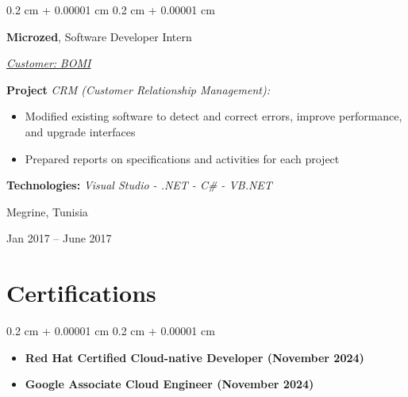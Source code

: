 \documentclass[10pt, a4paper]{article}
\newenvironment{highlights}{
    \begin{itemize}[
        topsep=0.10 cm,
        parsep=0.10 cm,
        partopsep=0pt,
        itemsep=0pt,
        leftmargin=0.4 cm + 10pt
    ]
}{
    \end{itemize}
} %
\newenvironment{highlightsforbulletentries}{
    \begin{itemize}[
        topsep=0.10 cm,
        parsep=0.10 cm,
        partopsep=0pt,
        itemsep=0pt,
        leftmargin=10pt
    ]
}{
    \end{itemize}
} %
\newenvironment{onecolentry}{
    \begin{adjustwidth}{
        0.2 cm + 0.00001 cm
    }{
        0.2 cm + 0.00001 cm
    }
}{
    \end{adjustwidth}
} %
\newenvironment{twocolentry}[2][]{
    \onecolentry
    \def\secondColumn{#2}
    \setcolumnwidth{\fill, 4.5 cm}
    \begin{paracol}{2}
}{
    \switchcolumn \raggedleft \secondColumn
    \end{paracol}
    \endonecolentry
} %
\begin{document}
        \begin{twocolentry}{
            \fontsize{14}{18}Megrine, Tunisia

        Jan 2017 – June 2017
            \normalsize
        }
            \fontsize{12}{16}
            \textcolor{secondaryColor}{\faBriefcase\hspace{4pt}\textbf{Microzed},} Software Developer Intern
            \normalsize

            \vspace{0.10 cm}
                \vspace{0.10 cm}

                \textcolor{tertiaryColor}{\faAngleDoubleRight\hspace{0.1cm}\underline{\textit{Customer:} \textit{BOMI}}}

                \vspace{0.2cm}
                \textbf{Project \faAngleRight} \textit{CRM (Customer Relationship Management):}

                \begin{highlights}
                        \item Modified existing software to detect and correct errors, improve performance, and upgrade interfaces
                        \item Prepared reports on specifications and activities for each project
                \end{highlights}
                \faBuffer
                \textbf{ Technologies:} \textit{Visual Studio - .NET - C\# - VB.NET}

                \vspace{0.10 cm}

        \end{twocolentry}



    
    \section{Certifications}

    \begin{onecolentry}
        \begin{highlightsforbulletentries}


        \item \textbf{Red Hat Certified Cloud-native Developer (November 2024)}

        \item \textbf{Google Associate Cloud Engineer (November 2024)}


        \end{highlightsforbulletentries}
    \end{onecolentry}
\end{document}
